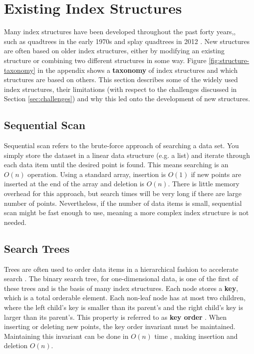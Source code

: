 \section{Existing Index Structures}
\label{sec:structures}

Many index structures have been developed throughout the past forty years,, such as quadtrees in the early 1970s \cite{quadtree} and splay quadtrees in 2012 \cite{splay-quadtree}. New structures are often based on older index structures, either by modifying an existing structure or combining two different structures in some way. Figure \ref{fig:structure-taxonomy} in the appendix shows a \textbf{taxonomy} of index structures and which structures are based on others. This section describes some of the widely used index structures, their limitations (with respect to the challenges discussed in Section \ref{sec:challenges}) and why this led onto the development of new structures.

\subsection{Sequential Scan}

Sequential scan refers to the brute-force approach of searching a data set. You simply store the dataset in a linear data structure (e.g. a list) and iterate through each data item until the desired point is found. This means searching is an $O(n)$ operation. Using a standard array, insertion is $O(1)$ if new points are inserted at the end of the array and deletion is $O(n)$. There is little memory overhead for this approach, but search times will be very long if there are large number of points. Nevertheless, if the number of data items is small, sequential scan might be fast enough to use, meaning a more complex index structure is not needed.

\subsection{Search Trees}

Trees are often used to order data items in a hierarchical fashion to accelerate search \cite{introduction-to-algorithms}. The binary search tree, for one-dimensional data, is one of the first of these trees and is the basis of many index structures. Each node stores a \textbf{key}, which is a total orderable element. Each non-leaf node has at most two children, where the left child's key is smaller than its parent's and the right child's key is larger than its parent's. This property is referred to as \textbf{key order} \cite{rst}. When inserting or deleting new points, the key order invariant must be maintained. Maintaining this invariant can be done in $O(n)$ time \cite{introduction-to-algorithms}, making insertion and deletion $O(n)$.

